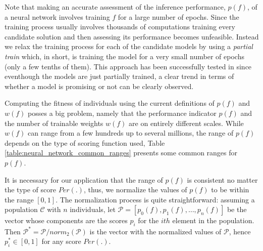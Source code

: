 \documentclass[journal]{IEEEtran}
\begin{document}
Note that making an accurate assessment of the inference performance, $p(f)$, of a neural network involves training $f$ for a large number of epochs. Since the training process usually involves thousands of computations training every candidate solution and then assessing its performance becomes unfeasible. Instead we relax the training process for each of the candidate models by using a \textit{partial train} which, in short, is training the model for a very small number of epochs (only a few tenths of them). This approach has been successfully tested in \cite{Laredo2018} since eventhough the models are just partially trained, a clear trend in terms of whether a model is promising or not can be clearly observed.

Computing the fitness of individuals using the current definitions of $p(f)$ and $w(f)$ posses a big problem, namely that the performance indicator $p(f)$ and the number of trainable weights $w(f)$ are on entirely different scales. While $w(f)$ can range from a few hundreds up to several millions, the range of $p(f)$ depends on the type of scoring function used, Table \ref{table:neural_network_common_ranges} presents some common ranges for $p(f)$. 

\begin{table}[!htb]
\begin{center}
\end{center}
\caption{Common ranges for some neural network performance indicators.}
\label{table:neural_network_common_ranges}
\end{table}

It is necessary for our application that the range of $p(f)$ is consistent no matter the type of score $Per(.)$, thus, we normalize the values of $p(f)$ to be within the range $\left[ 0,1 \right]$. The normalization process is quite straightforward: assuming a population $\mathcal{C}$ with $n$ individuals, let $\mathcal{P} = \left[ p_0(f), p_1(f), \ldots, p_n(f) \right]$ be the vector whose components are the scores $p_i$ for the $ith$ element in the population. Then $\mathcal{P}^* = \mathcal{P}/norm_2(\mathcal{P})$ is the vector with the normalized values of $\mathcal{P}$, hence $p^*_i \in \left[ 0, 1 \right]$ for any score $Per(.)$.
\end{document}
